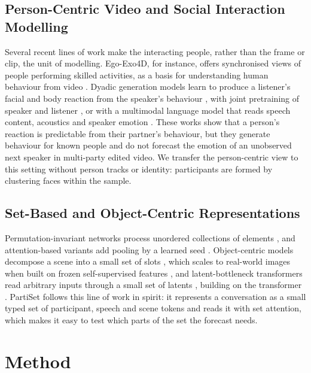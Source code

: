 \documentclass[11pt]{article}
\newcommand{\model}{PartiSet}
\begin{document}
\subsection{Person-Centric Video and Social Interaction Modelling}

Several recent lines of work make the interacting people, rather than the frame or clip, the unit of modelling.
Ego-Exo4D, for instance, offers synchronised views of people performing skilled activities, as a basis for
understanding human behaviour from video \citep{grauman2024egoexo4d}. Dyadic generation models learn to produce a
listener's facial and body reaction from the speaker's behaviour \citep{ng2022learning}, with joint pretraining of
speaker and listener \citep{tran2024dim}, or with a multimodal language model that reads speech content, acoustics
and speaker emotion \citep{lai2025listening}. These works
show that a person's reaction is predictable from their partner's behaviour, but they generate behaviour for known
people and do not forecast the emotion of an unobserved next speaker in multi-party edited video. We transfer the
person-centric view to this setting without person tracks or identity: participants are formed by clustering faces
within the sample.

\subsection{Set-Based and Object-Centric Representations}

Permutation-invariant networks process unordered collections of elements \citep{zaheer2017deep}, and attention-based
variants add pooling by a learned seed \citep{lee2019set}. Object-centric models decompose a scene into a small set of
slots \citep{locatello2020slot}, which scales to real-world images when built on frozen self-supervised features
\citep{seitzer2023dinosaur}, and latent-bottleneck transformers read arbitrary inputs through a small set of latents
\citep{jaegle2022perceiverio}, building on the transformer \citep{vaswani2017attention}. \model{} follows this line of
work in spirit: it represents a conversation as a small typed set of participant, speech and scene tokens and reads it
with set attention, which makes it easy to test which parts of the set the forecast needs.

\section{Method}
\label{sec:method}
\end{document}
